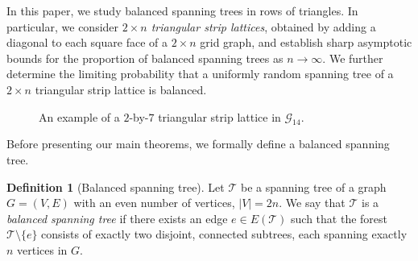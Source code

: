 \documentclass{amsart}
\theoremstyle{definition}
\newtheorem{defn}{Definition}
\newcommand{\yandi}[1]{\marginpar{\tiny \color{red} Yandi: #1}}
\newcommand{\red}[1]{\textcolor{red}{#1}}
\begin{document}
In this paper, we study balanced spanning trees in rows of triangles. %
In particular, we consider \emph{$2\times n$ triangular strip lattices}, obtained by adding a diagonal to each square face of a $2\times n$ grid graph, and establish sharp asymptotic bounds for the proportion of balanced spanning trees as $n\to \infty.$ We further determine the limiting probability that a uniformly random spanning tree of a $2 \times n$ triangular strip lattice is balanced.

\begin{figure}[H]
    \centering
    \caption{An example of a $2$-by-$7$ triangular strip lattice in $\mathscr{G}_{14}$.}
   \label{fig:trianglestriplattice}
\end{figure}

Before presenting our main theorems, we formally define a balanced spanning tree.

\begin{defn}[Balanced spanning tree]\label{defn: Balanced_spanning_tree}
Let $\mathcal{T}$ be a spanning tree of a graph $G = (V, E)$ with an even number of vertices, $|V| = 2n$. We say that $\mathcal{T}$ is a \emph{balanced spanning tree} if there exists an edge $e \in E(\mathcal{T})$ such that the forest $\mathcal{T} \setminus \{e\}$ consists of exactly two disjoint, connected subtrees, each spanning exactly $n$ vertices in $G$. 
\end{defn}

\end{document}
